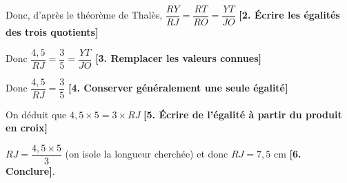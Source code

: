 \begin{pageCours}
\begin{ExCor}
Donc, d'après le théorème de Thalès, $\dfrac{RY}{RJ}=\dfrac{RT}{RO}=\dfrac{YT}{JO}$ {\color{sacado_blue}\textbf{[2. Écrire les égalités des trois quotients]}}

Donc $\dfrac{4,5}{RJ}=\dfrac{3}{5}=\dfrac{YT}{JO}$ {\color{sacado_blue}\textbf{[3. Remplacer les valeurs connues]}}

Donc $\dfrac{4,5}{RJ}=\dfrac{3}{5}$ {\color{sacado_blue}\textbf{[4. Conserver généralement une seule égalité]}}

On déduit que $4,5 \times 5=3\times RJ$ {\color{sacado_blue}\textbf{[5. Écrire de l'égalité à partir du produit en croix]}}

$RJ= \dfrac{4,5 \times 5}{3}$  (on \og isole \fg{} la longueur cherchée) et donc $RJ=7,5$ cm {\color{sacado_blue}\textbf{[6. Conclure]}}.
\end{ExCor}


\end{pageCours} 
